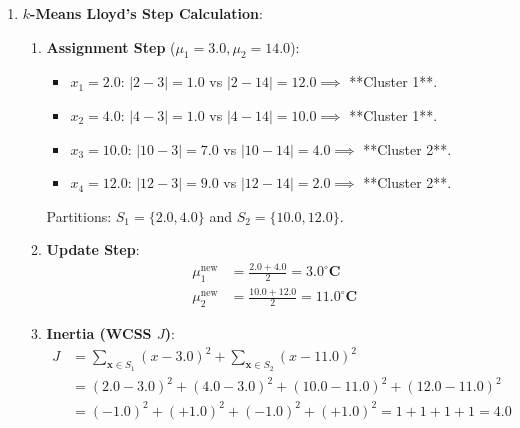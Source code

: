\begin{enumerate}
    \item \textbf{$k$-Means Lloyd's Step Calculation}:
    \begin{enumerate}[label=(\alph*)]
        \item \textbf{Assignment Step} ($\mu_1 = 3.0, \mu_2 = 14.0$):
        \begin{itemize}
            \item $x_1 = 2.0$: $|2 - 3| = 1.0$ vs $|2 - 14| = 12.0 \implies$ **Cluster 1**.
            \item $x_2 = 4.0$: $|4 - 3| = 1.0$ vs $|4 - 14| = 10.0 \implies$ **Cluster 1**.
            \item $x_3 = 10.0$: $|10 - 3| = 7.0$ vs $|10 - 14| = 4.0 \implies$ **Cluster 2**.
            \item $x_4 = 12.0$: $|12 - 3| = 9.0$ vs $|12 - 14| = 2.0 \implies$ **Cluster 2**.
        \end{itemize}
        Partitions: $S_1 = \{2.0, 4.0\}$ and $S_2 = \{10.0, 12.0\}$.

        \item \textbf{Update Step}:
        \begin{align*}
        \mu_1^{\text{new}} &= \frac{2.0 + 4.0}{2} = \mathbf{3.0^\circ\text{C}} \\
        \mu_2^{\text{new}} &= \frac{10.0 + 12.0}{2} = \mathbf{11.0^\circ\text{C}}
        \end{align*}

        \item \textbf{Inertia (WCSS $J$)}:
        \begin{align*}
        J &= \sum_{\mathbf{x} \in S_1} (x - 3.0)^2 + \sum_{\mathbf{x} \in S_2} (x - 11.0)^2 \\
        &= (2.0 - 3.0)^2 + (4.0 - 3.0)^2 + (10.0 - 11.0)^2 + (12.0 - 11.0)^2 \\
        &= (-1.0)^2 + (+1.0)^2 + (-1.0)^2 + (+1.0)^2 = 1 + 1 + 1 + 1 = \mathbf{4.0}
        \end{align*}
    \end{enumerate}


\end{enumerate}
